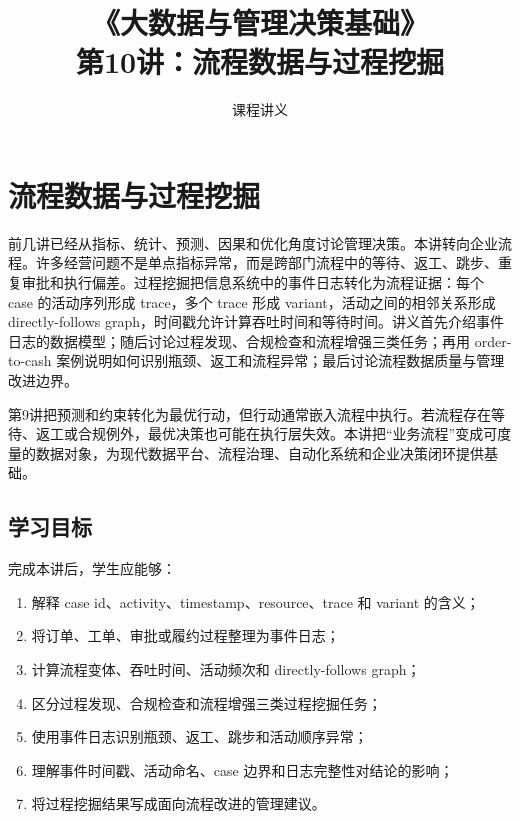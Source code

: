 \documentclass[UTF8,fontset=fandol,openany,zihao=-4]{ctexbook}
\title{《大数据与管理决策基础》\\[0.5em]\large 第10讲：流程数据与过程挖掘}
\author{课程讲义}
\date{}
\begin{document}
\maketitle
\tableofcontents

\setcounter{chapter}{9}
\chapter{流程数据与过程挖掘}
\label{ch:week10-process-mining}

\begin{chapterbox}
前几讲已经从指标、统计、预测、因果和优化角度讨论管理决策。本讲转向企业流程。许多经营问题不是单点指标异常，而是跨部门流程中的等待、返工、跳步、重复审批和执行偏差。过程挖掘把信息系统中的事件日志转化为流程证据：每个 case 的活动序列形成 trace，多个 trace 形成 variant，活动之间的相邻关系形成 directly-follows graph，时间戳允许计算吞吐时间和等待时间。讲义首先介绍事件日志的数据模型；随后讨论过程发现、合规检查和流程增强三类任务；再用 order-to-cash 案例说明如何识别瓶颈、返工和流程异常；最后讨论流程数据质量与管理改进边界。
\end{chapterbox}

\begin{modernbox}[课程接口]
第9讲把预测和约束转化为最优行动，但行动通常嵌入流程中执行。若流程存在等待、返工或合规例外，最优决策也可能在执行层失效。本讲把“业务流程”变成可度量的数据对象，为现代数据平台、流程治理、自动化系统和企业决策闭环提供基础。
\end{modernbox}

\section{学习目标}

完成本讲后，学生应能够：
\begin{enumerate}
  \item 解释 case id、activity、timestamp、resource、trace 和 variant 的含义；
  \item 将订单、工单、审批或履约过程整理为事件日志；
  \item 计算流程变体、吞吐时间、活动频次和 directly-follows graph；
  \item 区分过程发现、合规检查和流程增强三类过程挖掘任务；
  \item 使用事件日志识别瓶颈、返工、跳步和活动顺序异常；
  \item 理解事件时间戳、活动命名、case 边界和日志完整性对结论的影响；
  \item 将过程挖掘结果写成面向流程改进的管理建议。
\end{enumerate}
\end{document}
